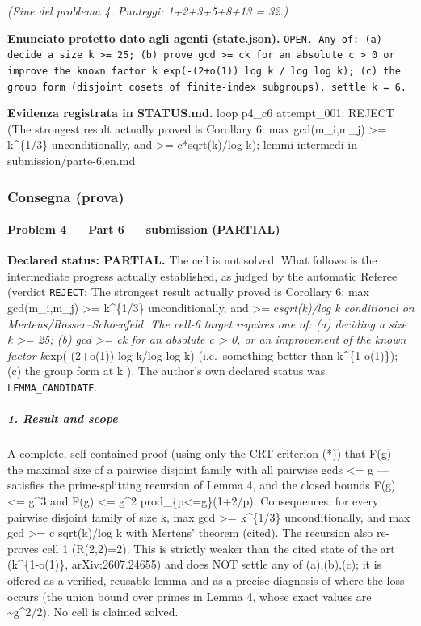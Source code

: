 \documentclass[11pt,a4paper]{article}
\begin{document}
\emph{(Fine del problema 4. Punteggi: 1+2+3+5+8+13 = 32.)}

\textbf{Enunciato protetto dato agli agenti (state.json).} \texttt{OPEN. Any of: (a) decide a size k \textgreater{}= 25; (b) prove gcd \textgreater{}= ck for an absolute c \textgreater{} 0 or improve the known factor k exp(-(2+o(1)) log k / log log k); (c) the group form (disjoint cosets of finite-index subgroups), settle k = 6.}

\textbf{Evidenza registrata in STATUS.md.} loop p4\_c6 attempt\_001: REJECT (The strongest result actually proved is Corollary 6: max gcd(m\_i,m\_j) \textgreater{}= k\textasciicircum{}\{1/3\} unconditionally, and \textgreater{}= c*sqrt(k)/log k); lemmi intermedi in submission/parte-6.en.md

\subsubsection{Consegna (prova)}
\paragraph{Problem 4 --- Part 6 --- submission
(PARTIAL)}\label{problem-4-part-6-submission-partial}

\textbf{Declared status: PARTIAL.} The cell is not solved. What follows
is the intermediate progress actually established, as judged by the
automatic Referee (verdict \texttt{REJECT}: The strongest result
actually proved is Corollary 6: max gcd(m\_i,m\_j) \textgreater=
k\^{}\{1/3\} unconditionally, and \textgreater= c\emph{sqrt(k)/log k
conditional on Mertens/Rosser--Schoenfeld. The cell-6 target requires
one of: (a) deciding a size k \textgreater= 25; (b) gcd \textgreater= ck
for an absolute c \textgreater{} 0, or an improvement of the known
factor k}exp(-(2+o(1)) log k/log log k) (i.e.~something better than
k\^{}\{1-o(1)\}); (c) the group form at k ). The author's own declared
status was \texttt{LEMMA\_CANDIDATE}.

\subparagraph{1. Result and scope}\label{result-and-scope}

A complete, self-contained proof (using only the CRT criterion (*)) that
F(g) --- the maximal size of a pairwise disjoint family with all
pairwise gcds \textless= g --- satisfies the prime-splitting recursion
of Lemma 4, and the closed bounds F(g) \textless= g\^{}3 and F(g)
\textless= g\^{}2 prod\_\{p\textless=g\}(1+2/p). Consequences: for every
pairwise disjoint family of size k, max gcd \textgreater= k\^{}\{1/3\}
unconditionally, and max gcd \textgreater= c sqrt(k)/log k with Mertens'
theorem (cited). The recursion also re-proves cell 1 (R(2,2)=2). This is
strictly weaker than the cited state of the art (k\^{}\{1-o(1)\},
arXiv:2607.24655) and does NOT settle any of (a),(b),(c); it is offered
as a verified, reusable lemma and as a precise diagnosis of where the
loss occurs (the union bound over primes in Lemma 4, whose exact values
are \textasciitilde g\^{}2/2). No cell is claimed solved.
\end{document}
